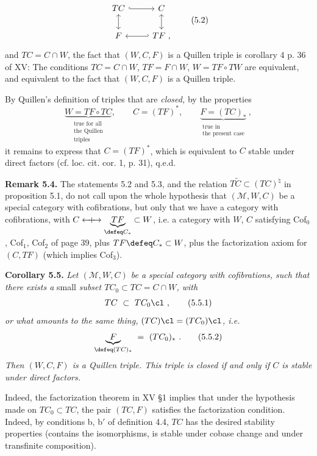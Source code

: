 \[
\begin{tikzcd}
TC \arrow[r, hook] \arrow[d, leftrightarrow] & C \arrow[d, leftrightarrow] \\
F & TF \arrow[l, hook'] \ ,
\end{tikzcd}
\tag*{(5.2)}
\]
and $TC = C \cap W$, the fact that $(W, C, F)$ is a Quillen triple is corollary 4 p. 36 of XV: The conditions $TC = C \cap W$, $TF = F \cap W$, $W = TF \circ TW$ are equivalent, and equivalent to the fact that $(W, C, F)$ is a Quillen triple.

By Quillen's definition of triples that are \textit{closed,} by the properties
\[
\underbrace{W = TF \circ TC}_{\substack{\text{true for all}\\ \text{the Quillen}\\ \text{triples}}}, \qquad C = (TF)^*, \qquad \underbrace{F = (TC)_*}_{\substack{\text{true in}\\ \text{the present case}}}\ , %
\]
it remains to express that $C = (TF)^*$, which is equivalent to $C$ stable under direct factors (cf. loc. cit. cor. 1, p. 31), q.e.d.

\textbf{Remark 5.4.} The statements 5.2 and 5.3, and the relation $T\tilde{C} \subset (TC)^\natural$ in proposition 5.1, do not call upon the whole hypothesis that $(\mathcal{M}, W, C)$ be a special category with cofibrations, but only that we have a category with cofibrations, with $C \mathrel{\leftarrow\!\!\!+\!\!\!\rightarrow} \underbrace{TF}_{\defeq C_*} \subset W$, %
i.e. a category with $W$, $C$ satisfying Cof$_0$, Cof$_1$, Cof$_2$ of page 39, plus $TF \defeq C_* \subset W$, plus the factorization axiom for $(C, TF)$ (which implies Cof$_3$).

\textbf{Corollary 5.5.} \textit{Let $(\mathcal{M}, W, C)$ be a special category with cofibrations, such that there exists a} small \textit{subset $TC_0 \subset TC = C \cap W$, with}
\[
TC \ \subset \ TC_0\cl\ ,
\tag*{(5.5.1)}
\]
\textit{or what amounts to the same thing, $(TC)\cl = (TC_0)\cl$, i.e.}
\[
\underbrace{F}_{\defeq (TC)_*} \ = \ (TC_0)_*\ .
\tag*{(5.5.2)}
\]
\textit{Then $(W, C, F)$ is a Quillen triple. This triple is closed if and only if $C$ is stable under direct factors.}

Indeed, the factorization theorem in XV §1 implies that under the hypothesis made on $TC_0 \subset TC$, the pair $(TC, F)$ satisfies the factorization condition. Indeed, by conditions b, b$'$ of definition 4.4, $TC$ has the desired stability properties (contains the isomorphisms, is stable under cobase change and under transfinite composition).

